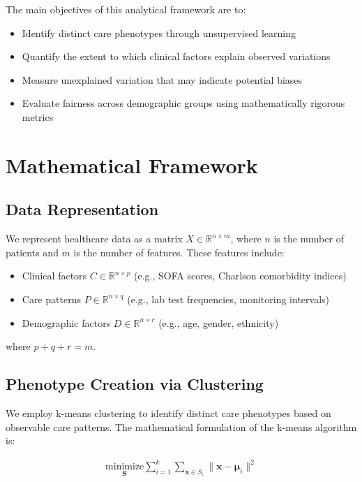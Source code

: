 \documentclass[12pt]{article}
\begin{document}
The main objectives of this analytical framework are to:

\begin{itemize}
    \item Identify distinct care phenotypes through unsupervised learning
    \item Quantify the extent to which clinical factors explain observed variations
    \item Measure unexplained variation that may indicate potential biases
    \item Evaluate fairness across demographic groups using mathematically rigorous metrics
\end{itemize}

\section{Mathematical Framework}

\subsection{Data Representation}

We represent healthcare data as a matrix $X \in \mathbb{R}^{n \times m}$, where $n$ is the number of patients and $m$ is the number of features. These features include:

\begin{itemize}
    \item Clinical factors $C \in \mathbb{R}^{n \times p}$ (e.g., SOFA scores, Charlson comorbidity indices)
    \item Care patterns $P \in \mathbb{R}^{n \times q}$ (e.g., lab test frequencies, monitoring intervals)
    \item Demographic factors $D \in \mathbb{R}^{n \times r}$ (e.g., age, gender, ethnicity)
\end{itemize}

where $p + q + r = m$.

\subsection{Phenotype Creation via Clustering}

We employ k-means clustering to identify distinct care phenotypes based on observable care patterns. The mathematical formulation of the k-means algorithm is:

\begin{align}
\underset{\mathbf{S}}{\text{minimize}} \sum_{i=1}^{k} \sum_{\mathbf{x} \in S_i} \|\mathbf{x} - \boldsymbol{\mu}_i\|^2
\end{align}
\end{document}
